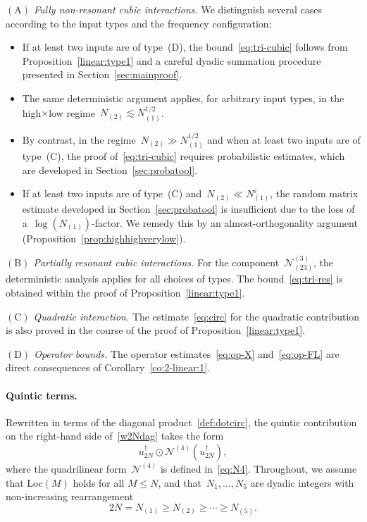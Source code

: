 \documentclass[11pt,reqno,english]{amsart}
\numberwithin{equation}{section}
\theoremstyle{plain}
\theoremstyle{definition}
\theoremstyle{remark}
\renewcommand{\epsilon}{\varepsilon}
\newcommand{\dotcirc}{\mathbin{\odot}}
\begin{document}
\emph{$(\mathrm{A})$ Fully non-resonant cubic interactions.}
We distinguish several cases according to the input types and the frequency configuration:
\begin{itemize}
	\item If at least two inputs are of type~(D), the bound~\eqref{eq:tri-cubic} follows from Proposition~\ref{linear:type1} and a careful dyadic summation procedure presented in Section~\ref{sec:mainproof}.

	\item The same deterministic argument applies, for arbitrary input types, in the high$\times$low regime~$N_{(2)}\lesssim N_{(1)}^{1/2}$.

	\item By contrast, in the regime~$N_{(2)}\gg N_{(1)}^{1/2}$ and when at least two inputs are of type~(C), the proof of~\eqref{eq:tri-cubic} requires probabilistic estimates, which are developed in Section~\ref{sec:probatool}.

	\item If at least two inputs are of type~(C) and~$N_{(2)}\ll N_{(1)}^{\epsilon}$, the random matrix estimate developed in Section~\ref{sec:probatool} is insufficient due to the loss of a~$\log(N_{(1)})$-factor. We remedy this by an almost-orthogonality argument (Proposition~\ref{prop:highhighverylow}).
\end{itemize}

\emph{$(\mathrm{B})$ Partially resonant cubic interactions.}
For the component~$\mathcal{N}_{(23)}^{(3)}$, the deterministic analysis applies for all choices of types.
The bound~\eqref{eq:tri-res} is obtained within the proof of Proposition~\ref{linear:type1}.

\emph{$(\mathrm{C})$ Quadratic interaction.}
The estimate~\eqref{eq:circ} for the quadratic contribution
is also proved in the course of the proof of Proposition~\ref{linear:type1}.

\emph{$(\mathrm{D})$ Operator bounds.}
The operator estimates~\eqref{eq:op-X} and~\eqref{eq:op-FL} are direct consequences of
Corollary~\ref{co:2-linear:1}.
\medskip

\paragraph{ \bf Quintic terms.}
Rewritten in terms of the diagonal product~\eqref{def:dotcirc}, the quintic contribution on the right-hand side of~\eqref{w2Ndag} takes the form
\[
u_{2N}^{\dag}\dotcirc \mathcal{N}^{(4)}(u_{2N}^{\dag}),
\]
where the quadrilinear form~$\mathcal{N}^{(4)}$ is defined in~\eqref{eq:N4}.
Throughout, we assume that Loc$(M)$ holds for all $M\leq N$, and that~$N_1,\dots,N_5$ are dyadic integers with non-increasing rearrangement
\[
2N = N_{(1)} \geq N_{(2)} \geq \cdots \geq N_{(5)}.
\]
\end{document}
